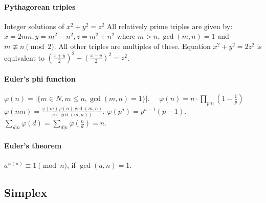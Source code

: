 \documentclass[10pt,letterpaper,twocolumn,twosided]{article}
\begin{document}
\paragraph{Pythagorean triples} Integer solutions of $x^{2}+y^{2}=z^{2}$
All relatively prime triples are given by: $x=2mn,y=m^{2}-n^{2},z=m^{2}+n^{2}$
where $m>n,\gcd(m,n)=1$ and $m\not\equiv n\pmod{2}$. All other triples
are multiples of these. Equation $x^{2}+y^{2}=2z^{2}$ is equivalent
to $(\frac{x+y}{2})^{2}+(\frac{x-y}{2})^{2}=z^{2}$.

\paragraph{Euler's phi function} $\varphi(n)=|\{m\in{N},m\le n,\gcd(m,n)=1\}|$.
$\quad\varphi(n)=n\cdot\prod_{p|n}\left(1-\frac{1}{p}\right)$\\
 $\varphi(mn)=\frac{\varphi(m)\varphi(n)\gcd(m,n)}{\varphi(\gcd(m,n))}$.
\quad{}$\varphi(p^{a})=p^{a-1}(p-1)$. \quad{}$\sum_{d|n}\varphi(d)=\sum_{d|n}\varphi(\frac{n}{d})=n$.

\paragraph{Euler's theorem} $a^{\varphi(n)}\equiv1\pmod{n}$, if $\gcd(a,n)=1$.

\subsection{Simplex}
\end{document}
